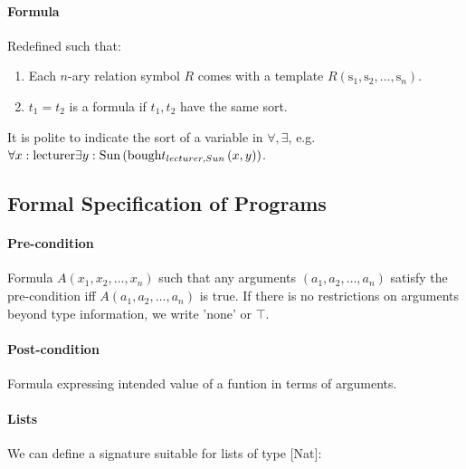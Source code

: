 \documentclass[10pt,twoside,twocolumn]{article}
\begin{document}
\paragraph{Formula}

Redefined such that:
\begin{enumerate}
\item Each $n$-ary relation symbol $R$ comes with a template $R\left(\mbox{s}_{1},\mbox{s}_{2},\dots,\mbox{s}_{n}\right)$.
\item $t_{1}=t_{2}$ is a formula if $t_{1},t_{2}$ have the same sort.
\end{enumerate}
It is polite to indicate the sort of a variable in $\forall,\exists$,
e.g. $\forall x:\mbox{lecturer}\exists y:\mbox{Sun}\left(\mbox{bough\ensuremath{t_{lecturer,Sun}}}\left(x,y\right)\right)$.


\subsection{Formal Specification of Programs}


\paragraph{Pre-condition}

Formula $A\left(x_{1},x_{2},\dots,x_{n}\right)$ such that any arguments
$\left(a_{1},a_{2},\dots,a_{n}\right)$ satisfy the pre-condition
iff $A\left(a_{1},a_{2},\dots,a_{n}\right)$ is true. If there is no
restrictions on arguments beyond type information, we write 'none'
or $\top$.


\paragraph{Post-condition}

Formula expressing intended value of a funtion in terms of arguments.


\paragraph{Lists}

We can define a signature suitable for lists of type {[}Nat{]}:
\end{document}
